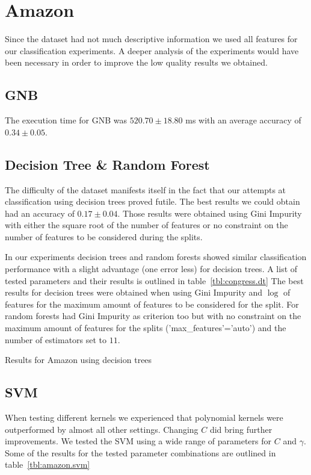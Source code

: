 \section{Amazon}
Since the dataset had not much descriptive information we used all features for our classification experiments.
A deeper analysis of the experiments would have been necessary in order to improve the low quality results we obtained.

\subsection{GNB}
The execution time for GNB was $520.70 \pm 18.80$ ms with an average accuracy of $0.34 \pm 0.05$.

\subsection{Decision Tree \& Random Forest}
The difficulty of the dataset manifests itself in the fact that our attempts at classification using decision trees proved futile.
The best results we could obtain had an accuracy of $0.17 \pm 0.04$.
Those results were obtained using Gini Impurity with either the square root of the number of features or no constraint on the number of features to be considered during the splits. 
 
In our experiments decision trees and random forests showed similar classification performance with a slight advantage (one error less) for decision trees. 
A list of tested parameters and their results is outlined in table~\ref{tbl:congress.dt}
The best results for decision trees were obtained when using Gini Impurity and $\log$ of features for the maximum amount of features to be considered for the split.
For random forests had Gini Impurity as criterion too but with no constraint on the maximum amount of features for the splits ('max\_features'='auto') and the number of estimators set to $11$. 

\begin{table}[htb]
\centering

\caption{Results for Amazon using decision trees}
\label{tbl:amazon.dt}
\end{table}

\subsection{SVM}
When testing different kernels we experienced that polynomial kernels were outperformed by almost all other settings.
Changing $C$ did bring further improvements.
We tested the SVM using a wide range of parameters for $C$ and $\gamma$.
Some of the results for the tested parameter combinations are outlined in table~\ref{tbl:amazon.svm}


